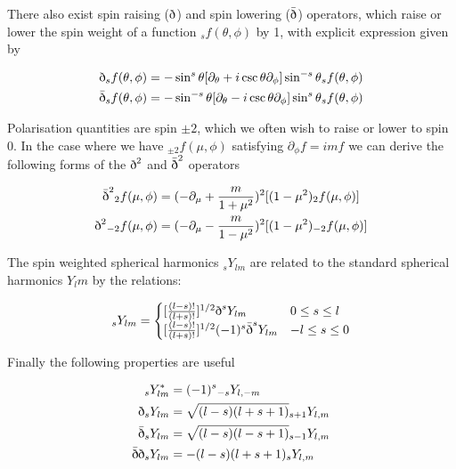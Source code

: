 \documentclass[a4paper,10pt]{article}
\newcommand{\sr}{\text{\normalfont\dh}}
\renewcommand{\sl}{\bar{\text{\normalfont\dh}}}
\begin{document}
There also exist spin raising ($\sr$) and spin lowering ($\sl$) operators, which raise or lower the spin weight of a function $_sf(\theta,\phi)$ by 1, with explicit expression given by

\begin{equation}\begin{split}
\sr {}_sf(\theta, \phi) &= -\sin^s{\theta}[\partial_\theta+i\csc{\theta}\partial_\phi]\sin^{-s}{\theta}{}_sf(\theta, \phi)\\
\sl {}_sf(\theta, \phi) &= -\sin^{-s}{\theta}[\partial_\theta-i\csc{\theta}\partial_\phi]\sin^{s}{\theta}{}_sf(\theta, \phi)
\label{explicitspinraiselower}
\end{split}\end{equation}

Polarisation quantities are spin $\pm 2$, which we often wish to raise or lower to spin 0. In the case where we have ${}_{\pm2}f(\mu,\phi)$ satisfying $\partial_\phi{}f=imf$ we can derive the following forms of the $\sr^2$ and $\sl^2$ operators

\begin{equation}\begin{split}
\sl^2{}_2f(\mu, \phi) &= (-\partial_\mu+\frac{m}{1+\mu^2})^2[(1-\mu^2)_2f(\mu,\phi)]\\
\sr^2{}_{-2}f(\mu, \phi) &= (-\partial_\mu-\frac{m}{1-\mu^2})^2[(1-\mu^2)_{-2}f(\mu,\phi)]
\label{+-2}
\end{split}\end{equation}

The spin weighted spherical harmonics $_sY_{lm}$ are related to the standard spherical harmonics $Y_lm$ by the relations:

\begin{equation}
_sY_{lm} = 
\begin{cases}
[\frac{(l-s)!}{(l+s)!}]^{1/2}\sr^s Y_{lm} & 0\leq s\leq l\\
[\frac{(l-s)!}{(l+s)!}]^{1/2}(-1)^s\sl^s Y_{lm} & -l\leq s\leq 0
\end{cases}
\end{equation}

Finally the following properties are useful

\begin{equation}\begin{split}
{}_sY_{lm}^* &= (-1)^s {}_{-s}Y_{l,-m}\\
\sr {}_sY_{lm} &= \sqrt{(l-s)(l+s+1)}{}_{s+1}Y_{l,m}\\
\sl {}_sY_{lm} &= \sqrt{(l-s)(l-s+1)}{}_{s-1}Y_{l,m}\\
\sl\sr {}_sY_{lm} &= -(l-s)(l+s+1){}_{s}Y_{l,m}
\label{propertiesofspin}
\end{split}\end{equation}
\end{document}
